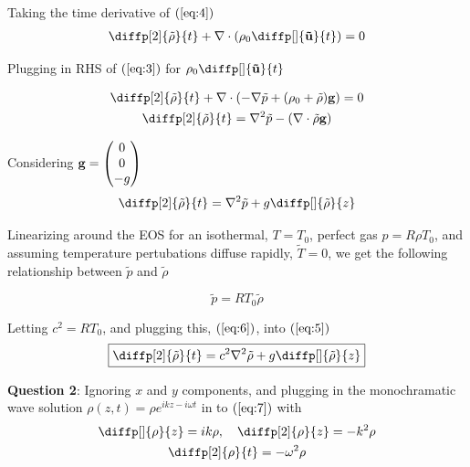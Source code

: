 Taking the time derivative of $(\ref{eq:4})$ 
\begin{gather*}
\diffp[2]{\tilde{\rho }}{t} + \nabla \cdot \left( \rho_0 \diffp[]{{\bf
\tilde{u}}}{t}\right) = 0 \\
\end{gather*}

Plugging in RHS of $(\ref{eq:3})$ for $\rho_0 \diffp[]{{\bf \tilde{u}}}{t}$ 

\begin{gather*}
  \diffp[2]{\tilde{\rho }}{t} + \nabla \cdot \left(-\nabla \tilde{p}
  + (\rho_0+\tilde{\rho})\bf{g} \right) = 0 \\
  \diffp[2]{\tilde{\rho }}{t} = \nabla^{2}\tilde{p} - (\nabla \cdot \tilde{\rho
  }{\bf g}
  )
\end{gather*}

Considering ${\bf g} = \begin{pmatrix} 0 \\ 0 \\ -g \end{pmatrix}$
\begin{equation}
  \diffp[2]{\tilde{\rho }}{t} = \nabla ^{2}\tilde{p} + g \diffp[]{\tilde{\rho
  }}{z} \label{eq:5}
\end{equation}

Linearizing around the EOS for an isothermal, $T = T_0$, perfect gas $p
= R \rho T_0$, and assuming temperature pertubations diffuse rapidly,
$\tilde{T} = 0$, we get the following relationship between $\tilde{p}$ and
$\tilde{\rho }$ 

\begin{equation}
  \tilde{p} = RT_0\tilde{\rho } \label{eq:6}
\end{equation}

Letting $c^{2}=RT_0$, and plugging this, $(\ref{eq:6})$, into $(\ref{eq:5})$ 
\begin{equation}
  \boxed{\diffp[2]{\tilde{\rho }}{t} = c^{2}\nabla ^{2}\tilde{\rho
  } + g \diffp[]{\tilde{\rho }}{z}} \label{eq:7}
\end{equation}

\textbf{Question 2}: Ignoring $x$ and $y$ components, and plugging in the
 monochramatic wave solution $\rho (z,t) = \hat{\rho
} e^{ikz-i \omega t}$ in to $(\ref{eq:7})$ with
\begin{gather*}
  \diffp[]{\rho }{z} = ik \rho  , \quad
  \diffp[2]{\rho }{z} = -k^{2}\rho \\
  \diffp[2]{\rho }{t} = -\omega ^{2}\rho \\
\end{gather*}

